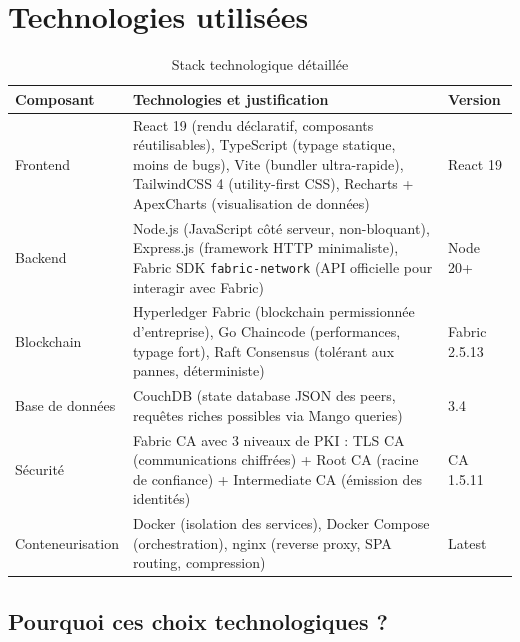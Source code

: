 \documentclass[12pt,a4paper,twoside]{report}
\begin{document}
\section{Technologies utilisées}

\begin{table}[H]
\centering
\begin{tabularx}{\textwidth}{lXl}
\toprule
\textbf{Composant} & \textbf{Technologies et justification} & \textbf{Version} \\
\midrule
Frontend & React 19 (rendu déclaratif, composants réutilisables), TypeScript (typage statique, moins de bugs), Vite (bundler ultra-rapide), TailwindCSS 4 (utility-first CSS), Recharts + ApexCharts (visualisation de données) & React 19 \\
Backend & Node.js (JavaScript côté serveur, non-bloquant), Express.js (framework HTTP minimaliste), Fabric SDK \texttt{fabric-network} (API officielle pour interagir avec Fabric) & Node 20+ \\
Blockchain & Hyperledger Fabric (blockchain permissionnée d'entreprise), Go Chaincode (performances, typage fort), Raft Consensus (tolérant aux pannes, déterministe) & Fabric 2.5.13 \\
Base de données & CouchDB (state database JSON des peers, requêtes riches possibles via Mango queries) & 3.4 \\
Sécurité & Fabric CA avec 3 niveaux de PKI : TLS CA (communications chiffrées) + Root CA (racine de confiance) + Intermediate CA (émission des identités) & CA 1.5.11 \\
Conteneurisation & Docker (isolation des services), Docker Compose (orchestration), nginx (reverse proxy, SPA routing, compression) & Latest \\
\bottomrule
\end{tabularx}
\caption{Stack technologique détaillée}
\end{table}

\subsection{Pourquoi ces choix technologiques ?}
\end{document}

